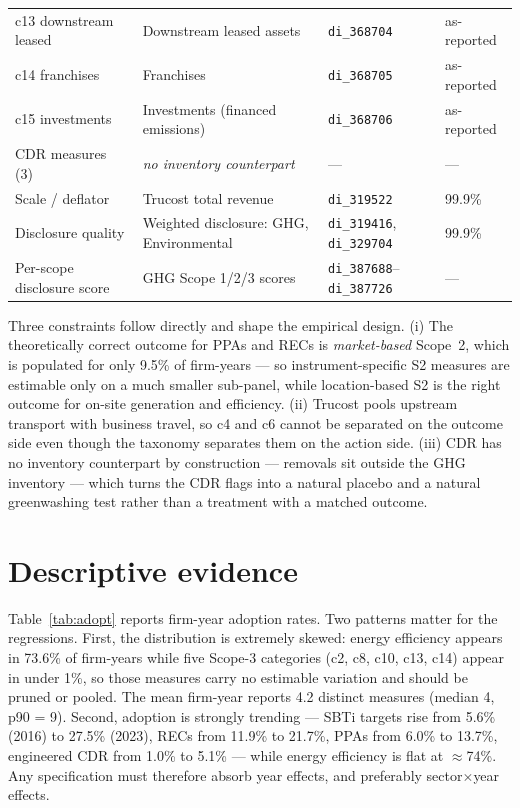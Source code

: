 \documentclass[11pt]{article}
\newcommand{\code}[1]{\texttt{\small #1}}
\begin{document}
\begin{table}[t]
\begin{tabular}{@{}llll@{}}
c13 downstream leased      & Downstream leased assets            & \code{di\_368704} & as-reported \\
c14 franchises             & Franchises                          & \code{di\_368705} & as-reported \\
c15 investments            & Investments (financed emissions)    & \code{di\_368706} & as-reported \\
CDR measures (3)           & \emph{no inventory counterpart}     & ---               & --- \\
\midrule
Scale / deflator           & Trucost total revenue               & \code{di\_319522} & 99.9\% \\
Disclosure quality         & Weighted disclosure: GHG, Environmental & \code{di\_319416}, \code{di\_329704} & 99.9\% \\
Per-scope disclosure score & GHG Scope 1/2/3 scores              & \code{di\_387688}--\code{di\_387726} & --- \\
\bottomrule
\end{tabular}
\end{table}

Three constraints follow directly and shape the empirical design. (i) The
theoretically correct outcome for PPAs and RECs is \emph{market-based} Scope~2,
which is populated for only 9.5\% of firm-years --- so instrument-specific S2
measures are estimable only on a much smaller sub-panel, while
location-based S2 is the right outcome for on-site generation and efficiency.
(ii) Trucost pools upstream transport with business travel, so c4 and c6
cannot be separated on the outcome side even though the taxonomy separates
them on the action side. (iii) CDR has no inventory counterpart by
construction --- removals sit outside the GHG inventory --- which turns the
CDR flags into a natural placebo and a natural greenwashing test rather than a
treatment with a matched outcome.

\section{Descriptive evidence}

Table~\ref{tab:adopt} reports firm-year adoption rates. Two patterns matter
for the regressions. First, the distribution is extremely skewed: energy
efficiency appears in 73.6\% of firm-years while five Scope-3 categories
(c2, c8, c10, c13, c14) appear in under 1\%, so those measures carry no
estimable variation and should be pruned or pooled. The mean firm-year
reports 4.2 distinct measures (median 4, p90 = 9). Second, adoption is
strongly trending --- SBTi targets rise from 5.6\% (2016) to 27.5\% (2023),
RECs from 11.9\% to 21.7\%, PPAs from 6.0\% to 13.7\%, engineered CDR from
1.0\% to 5.1\% --- while energy efficiency is flat at $\approx$74\%. Any
specification must therefore absorb year effects, and preferably
sector$\times$year effects.
\end{document}
